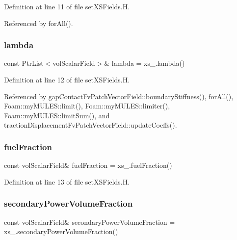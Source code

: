 Definition at line 11 of file set\+X\+S\+Fields.\+H.



Referenced by for\+All().

\mbox{\label{setXSFields_8H_a5947916d2a53602ab94837afe65c23dd}} 
\subsubsection{\texorpdfstring{lambda}{lambda}}
{\footnotesize\ttfamily const Ptr\+List$<$vol\+Scalar\+Field$>$\& lambda = xs\+\_\+.\+lambda()}



Definition at line 12 of file set\+X\+S\+Fields.\+H.



Referenced by gap\+Contact\+Fv\+Patch\+Vector\+Field\+::boundary\+Stiffness(), for\+All(), Foam\+::my\+M\+U\+L\+E\+S\+::limit(), Foam\+::my\+M\+U\+L\+E\+S\+::limiter(), Foam\+::my\+M\+U\+L\+E\+S\+::limit\+Sum(), and traction\+Displacement\+Fv\+Patch\+Vector\+Field\+::update\+Coeffs().

\mbox{\label{setXSFields_8H_a470c39405a89f3faff1aaaec7855c71f}} 
\subsubsection{\texorpdfstring{fuel\+Fraction}{fuelFraction}}
{\footnotesize\ttfamily const vol\+Scalar\+Field\& fuel\+Fraction = xs\+\_\+.\+fuel\+Fraction()}



Definition at line 13 of file set\+X\+S\+Fields.\+H.

\mbox{\label{setXSFields_8H_a8a174336055259a9d6e186e9ceb2f629}} 
\subsubsection{\texorpdfstring{secondary\+Power\+Volume\+Fraction}{secondaryPowerVolumeFraction}}
{\footnotesize\ttfamily const vol\+Scalar\+Field\& secondary\+Power\+Volume\+Fraction = xs\+\_\+.\+secondary\+Power\+Volume\+Fraction()}



